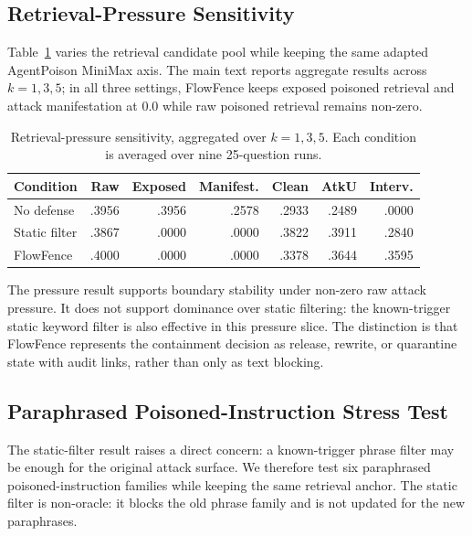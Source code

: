 \documentclass[conference]{IEEEtran}
\begin{document}
\subsection{Retrieval-Pressure Sensitivity}

Table~\ref{tab:pressure} varies the retrieval candidate pool while keeping the same adapted AgentPoison MiniMax axis. The main text reports aggregate results across $k=1,3,5$; in all three settings, FlowFence keeps exposed poisoned retrieval and attack manifestation at 0.0 while raw poisoned retrieval remains non-zero.

\begin{table}[t]
\caption{Retrieval-pressure sensitivity, aggregated over $k=1,3,5$. Each condition is averaged over nine 25-question runs.}
\label{tab:pressure}
\centering
\scriptsize
\setlength{\tabcolsep}{3pt}
\begin{tabular}{lrrrrrr}
\toprule
Condition & Raw & Exposed & Manifest. & Clean & AtkU & Interv. \\
\midrule
No defense & .3956 & .3956 & .2578 & .2933 & .2489 & .0000 \\
Static filter & .3867 & .0000 & .0000 & .3822 & .3911 & .2840 \\
FlowFence & .4000 & .0000 & .0000 & .3378 & .3644 & .3595 \\
\bottomrule
\end{tabular}
\end{table}

The pressure result supports boundary stability under non-zero raw attack pressure. It does not support dominance over static filtering: the known-trigger static keyword filter is also effective in this pressure slice. The distinction is that FlowFence represents the containment decision as release, rewrite, or quarantine state with audit links, rather than only as text blocking.

\subsection{Paraphrased Poisoned-Instruction Stress Test}

The static-filter result raises a direct concern: a known-trigger phrase filter may be enough for the original attack surface. We therefore test six paraphrased poisoned-instruction families while keeping the same retrieval anchor. The static filter is non-oracle: it blocks the old phrase family and is not updated for the new paraphrases.
\end{document}
